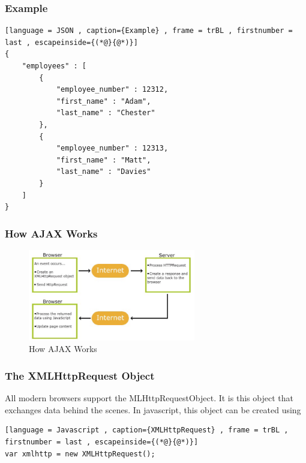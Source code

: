 \documentclass[a4paper]{article}
\theoremstyle{plain}
\theoremstyle{definition}
\theoremstyle{remark}
\begin{document}
\begin{flushleft}
\subsubsection{Example}
\begin{lstlisting}[language = JSON , caption={Example} , frame = trBL , firstnumber = last , escapeinside={(*@}{@*)}]
{
	"employees" : [
		{
			"employee_number" : 12312,
			"first_name" : "Adam",
			"last_name" : "Chester"
		},
		{
			"employee_number" : 12313,
			"first_name" : "Matt",
			"last_name" : "Davies"
		}
	]
}
\end{lstlisting}
\subsubsection{How AJAX Works}
\begin{figure}[H]
	\centering
	\includegraphics[width=0.65\textwidth]{figures/ajax.png}
	\caption{How AJAX Works}
	\label{fig:figures-ajax-png}
\end{figure}
\subsubsection{The XMLHttpRequest Object}
All modern browsers support the MLHttpRequestObject. It is this object that exchanges data behind the scenes. In javascript, this object can be created using
\begin{lstlisting}[language = Javascript , caption={XMLHttpRequest} , frame = trBL , firstnumber = last , escapeinside={(*@}{@*)}]
var xmlhttp = new XMLHttpRequest();
\end{lstlisting}

\end{flushleft}
\end{document}
